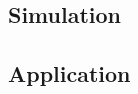 \subsection{Simulation} %
\label{sub:simulation}


\subsection{Application} %
\label{sub:application}



